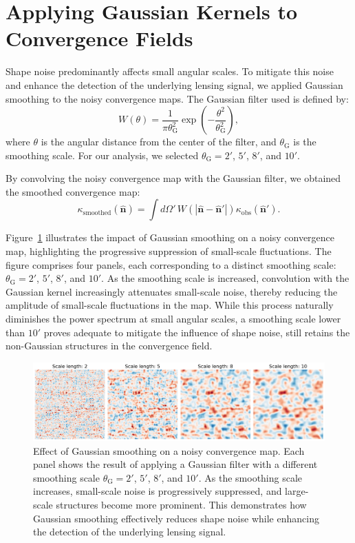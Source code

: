 \section{Applying Gaussian Kernels to Convergence Fields}
Shape noise predominantly affects small angular scales. To mitigate this noise and enhance the detection of the underlying lensing signal, we applied Gaussian smoothing to the noisy convergence maps. The Gaussian filter used is defined by:
\begin{equation}
    W(\theta) = \frac{1}{\pi \theta_{\mathrm{G}}^2} \exp\left( -\frac{\theta^2}{\theta_{\mathrm{G}}^2} \right),
\end{equation}
where $\theta$ is the angular distance from the center of the filter, and $\theta_{\mathrm{G}}$ is the smoothing scale. For our analysis, we selected $\theta_{\mathrm{G}} = 2'$, $5'$, $8'$, and $10'$.

By convolving the noisy convergence map with the Gaussian filter, we obtained the smoothed convergence map:
\begin{equation}
    \kappa_{\mathrm{smoothed}}(\hat{\mathbf{n}}) = \int d\Omega' \, W(|\hat{\mathbf{n}} - \hat{\mathbf{n}}'|) \kappa_{\mathrm{obs}}(\hat{\mathbf{n}}').
\end{equation}

Figure~\ref{fig:smoothing} illustrates the impact of Gaussian smoothing on a noisy convergence map, highlighting the progressive suppression of small-scale fluctuations. The figure comprises four panels, each corresponding to a distinct smoothing scale: $\theta_{\mathrm{G}} = 2'$, $5'$, $8'$, and $10'$. As the smoothing scale is increased, convolution with the Gaussian kernel increasingly attenuates small-scale noise, thereby reducing the amplitude of small-scale fluctuations in the map. While this process naturally diminishes the power spectrum at small angular scales, a smoothing scale lower than $10'$ proves adequate to mitigate the influence of shape noise, still retains the non-Gaussian structures in the convergence field.
\begin{figure}[ht]
    \centering
    \includegraphics[width=\textwidth]{figures/smoothed_comparison.png}
    \caption[Gaussian smoothing on a noisy convergence map for multiple smoothing scales]{Effect of Gaussian smoothing on a noisy convergence map. Each panel shows the result of applying a Gaussian filter with a different smoothing scale $\theta_{\mathrm{G}} = 2'$, $5'$, $8'$, and $10'$. As the smoothing scale increases, small-scale noise is progressively suppressed, and large-scale structures become more prominent. This demonstrates how Gaussian smoothing effectively reduces shape noise while enhancing the detection of the underlying lensing signal.}
\label{fig:smoothing}
\end{figure}

